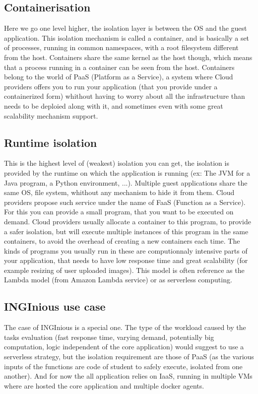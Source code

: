 \subsection{Containerisation}
Here we go one level higher, the isolation layer is between the OS and the guest application.  This isolation mechanism is called a container, and is basically a set of processes, running in common namespaces, with a root filesystem different from the host.  Containers share the same kernel as the host though, which means that a process running in a container can be seen from the host.  Containers belong to the world of PaaS (Platform as a Service), a system where Cloud providers offers you to run your application (that you provide under a containerized form) whithout having to worry about all the infrastructure than needs to be deploied along with it, and sometimes even with some great scalability mechanism support.
\subsection{Runtime isolation}
This is the highest level of (weakest) isolation you can get, the isolation is provided by the runtime on which the application is running (ex: The JVM for a Java program, a Python environment, ...).  Multiple guest applications share the same OS, file system, whithout any mechanism to hide it from them.  Cloud providers propose such service under the name of FaaS (Function as a Service).  For this you can provide a small program, that you want to be executed on demand.  Cloud providers usually allocate a container to this program, to provide a safer isolation, but will execute multiple instances of this program in the same containers, to avoid the overhead of creating a new containers each time.  The kinds of programs you usually run in these are computionnaly intensive parts of your application, that needs to have low response time and great scalability (for example resizing of user uploaded images).  This model is often reference as the Lambda model (from Amazon Lambda service) or as serverless computing.

\subsection{INGInious use case}
The case of INGInious is a special one.  The type of the workload caused by the tasks evaluation (fast response time, varying demand, potentially big computation, logic independent of the core application) would suggest to use a serverless strategy, but the isolation requirement are those of PaaS (as the various inputs of the functions are code of student to safely execute, isolated from one another).  And for now the all application relies on IaaS, running in multiple VMs where are hosted the core application and multiple docker agents.  

